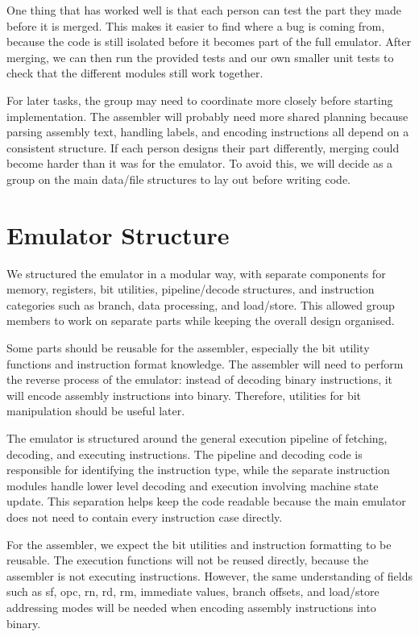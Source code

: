 \documentclass[11pt]{article}
\begin{document}
One thing that has worked well is that each person can test the part they made before it is merged. This makes it easier to find where a bug is coming from, because the code is still isolated before it becomes part of the full emulator. After merging, we can then run the provided tests and our own smaller unit tests to check that the different modules still work together.

For later tasks, the group may need to coordinate more closely before starting implementation. The assembler will probably need more shared planning because parsing assembly text, handling labels, and encoding instructions all depend on a consistent structure. If each person designs their part differently, merging could become harder than it was for the emulator. To avoid this, we will decide as a group on the main data/file structures to lay out before writing code.

\section{Emulator Structure}

We structured the emulator in a modular way, with separate components for memory, registers, bit utilities, pipeline/decode structures, and instruction categories such as branch, data processing, and load/store. This allowed group members to work on separate parts while keeping the overall design organised.

Some parts should be reusable for the assembler, especially the bit utility functions and instruction format knowledge. The assembler will need to perform the reverse process of the emulator: instead of decoding binary instructions, it will encode assembly instructions into binary. Therefore, utilities for bit manipulation should be useful later.

The emulator is structured around the general execution pipeline of fetching, decoding, and executing instructions. The pipeline and decoding code is responsible for identifying the instruction type, while the separate instruction modules handle lower level decoding and execution involving machine state update. This separation helps keep the code readable because the main emulator does not need to contain every instruction case directly.

For the assembler, we expect the bit utilities and instruction formatting to be reusable. The execution functions will not be reused directly, because the assembler is not executing instructions. However, the same understanding of fields such as sf, opc, rn, rd, rm, immediate values, branch offsets, and load/store addressing modes will be needed when encoding assembly instructions into binary.
\end{document}
